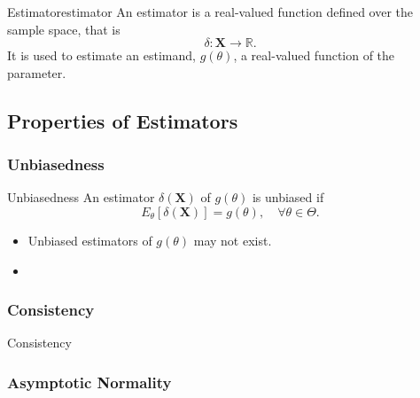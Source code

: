 \begin{definition}{Estimator}{estimator}
    An estimator is a real-valued function defined over the sample space, that is
    \begin{equation}
        \delta:\textbf{X}\rightarrow\mathbb{R}.
    \end{equation}
    It is used to estimate an estimand, $g(\theta)$, a real-valued function of the parameter.
\end{definition}

\subsection{Properties of Estimators}

\subsubsection*{Unbiasedness}

\begin{definition}{Unbiasedness}{}
    An estimator $\delta(\textbf{X})$ of $g(\theta)$ is unbiased if
    \begin{equation}
        E_\theta\left[\delta(\textbf{X})\right]=g(\theta),\quad\forall\theta\in\Theta.
    \end{equation}
\end{definition}

\begin{note}
    \begin{itemize}
        \item Unbiased estimators of $g(\theta)$ may not exist.
        \item 
    \end{itemize}
\end{note}

\begin{example}
    
\end{example}

\subsubsection*{Consistency}

\begin{definition}{Consistency}{}
    
\end{definition}

\subsubsection*{Asymptotic Normality}

